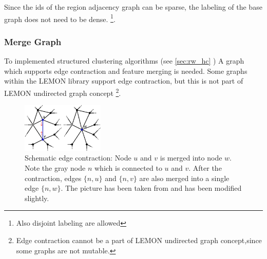 Since the ids of the region adjacency graph can be 
sparse, the labeling of the base graph does not need to be dense.
\footnote{Also disjoint labeling are allowed}.



\subsubsection{Merge Graph} \label{sec:graphs_merge_graph}

To implemented structured clustering algorithms (see \cref{sec:rw_hc} ) 
A graph which supports edge contraction and feature merging is needed.
Some graphs within the LEMON library support 
edge contraction, but this is not part of LEMON undirected graph concept \footnote{
Edge contraction cannot be a part of LEMON undirected graph concept,since some graphs
are not mutable.}.

\begin{figure}[H]
    \centering
    \includegraphics[width=0.35\textwidth]{fig/contraction.pdf}

    \caption[Schematic edge contraction]{ Schematic edge contraction: Node $u$ and $v$ is merged into node $w$.
        Note the gray node $n$ which is connected to $u$ and $v$.
        After the contraction, edges $\{ n,u\}$ and $\{ n,v\}$ are also merged into 
        a single edge $\{ n, w\}$.
        The picture has been taken from \citep{wiki_edge_contraction} and has been modified slightly.
    }
    \label{fig:figlabel}
\end{figure}


